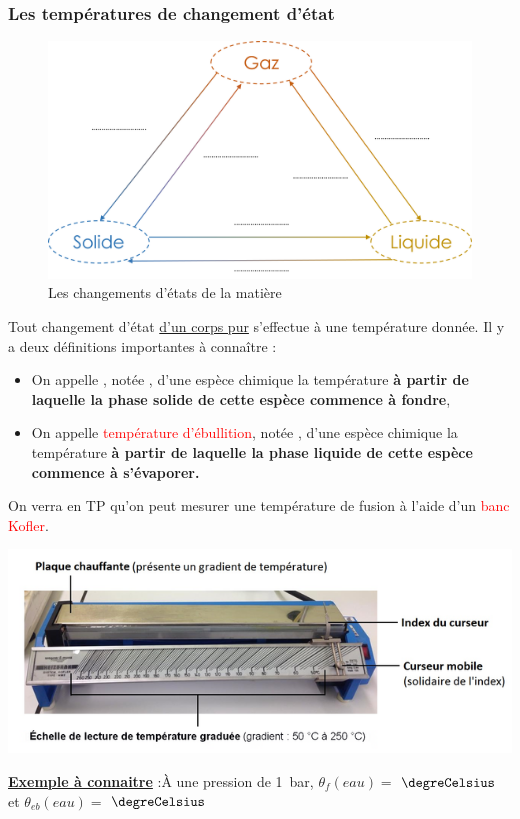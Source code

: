 \subsubsection{Les températures de changement d'état}
\begin{figure}[!htb]
    \centering
    \includegraphics[scale=0.5]{Images/Changement_etat.png}
    \caption{Les changements d'états de la matière}
    \label{fig:enter-label}
\end{figure}
Tout changement d'état \underline{d'un corps pur} s'effectue à une température donnée. Il y a deux définitions importantes à connaître :
\begin{itemize}
    \item On appelle , notée , d'une espèce chimique la température \textbf{à partir de laquelle la phase solide de cette espèce commence à fondre},
    \item On appelle \textcolor{red}{température d'ébullition}, notée , d'une espèce chimique la température \textbf{à partir de laquelle la phase liquide de cette espèce commence à s'évaporer.} 
\end{itemize}
On verra en TP qu'on peut mesurer une température de fusion à l'aide d'un \textcolor{red}{banc Kofler}.

\begin{minipage}{0.6\textwidth}
\includegraphics[width=1\textwidth]{Images/Banc_Kofler.png} 
  \end{minipage}
\begin{minipage}{0.4\textwidth}
\underline{\textbf{Exemple à connaitre}} :\newline \`{A} une pression de 1~bar, $\theta_{f}(eau)=$ $\degreCelsius$ et $\theta_{eb}(eau)=$ $\degreCelsius$
  \end{minipage}



